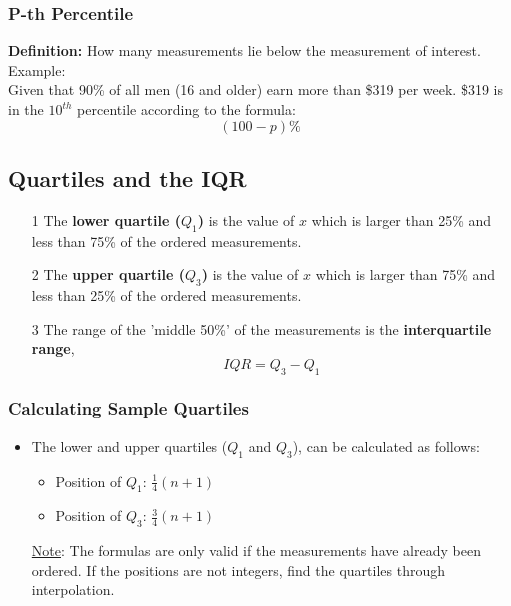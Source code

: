 \documentclass[12pt, letterpaper]{article}
\begin{document}
            \subsubsection{P-th Percentile}
                \textbf{Definition:} How many measurements lie below the measurement of interest. \\
                Example: \\ Given that 90\% of all men (16 and older) earn more than \$319 per week. \$319 is in the $10^{th}$ percentile according to the formula: $$(100 - p)\%$$ 
        
        \subsection{Quartiles and the IQR}
            \begin{itemize}
                \item[1] The \textbf{lower quartile ($Q_1$)} is the value of $x$ which is larger than 25\% and less than 75\% of the ordered measurements.
                \item[2] The \textbf{upper quartile ($Q_3$)} is the value of $x$ which is larger than 75\% and less than 25\% of the ordered measurements.
                \item[3] The range of the 'middle 50\%' of the measurements is the \textbf{interquartile range}, \smallskip 
                    \begin{equation}
                        IQR = Q_3 - Q_1
                    \end{equation}  
            \end{itemize}
            \subsubsection{Calculating Sample Quartiles}
                \begin{itemize}
                    \item The lower and upper quartiles ($Q_1$ and $Q_3$), can be calculated as follows:
                        \begin{itemize}
                            \item Position of $Q_1$: $\frac{1}{4}(n + 1)$
                            \item Position of $Q_3$: $\frac{3}{4}(n + 1)$
                        \end{itemize}
                        \underline{Note}: The formulas are only valid if the measurements have already been ordered. If the positions are not integers, find the quartiles through interpolation.
                \end{itemize}
\end{document}
